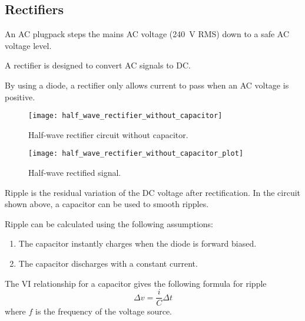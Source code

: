 \documentclass{article}
\begin{document}
\subsection{Rectifiers}
\begin{definition}[Plugpack]
    An AC plugpack steps the mains AC voltage (\SI{240}{\volt} RMS) down to a safe AC voltage level.
\end{definition}
\begin{definition}[Rectifier]
    A rectifier is designed to convert AC signals to DC\@.
\end{definition}
By using a diode, a rectifier only allows current to pass when an AC
voltage is positive.
\begin{figure}[H]
    \centering
    \texttt{[image: half\_wave\_rectifier\_without\_capacitor]}
    \caption{Half-wave rectifier circuit without capacitor.}
\end{figure}
\begin{figure}[H]
    \centering
    \texttt{[image: half\_wave\_rectifier\_without\_capacitor\_plot]}
    \caption{Half-wave rectified signal.}
\end{figure}
\begin{definition}[Ripple]
    Ripple is the residual variation of the DC voltage after rectification.
    In the circuit shown above, a capacitor can be used to smooth ripples.

    Ripple can be calculated using the following assumptions:
    \begin{enumerate}
        \item The capacitor instantly charges when the diode is forward biased.
        \item The capacitor discharges with a constant current.
    \end{enumerate}
    The VI relationship for a capacitor gives the following formula for ripple
    \begin{equation*}
        \Delta v = \frac{i}{C} \Delta t
    \end{equation*}
    where $f$ is the frequency of the voltage source.
\end{definition}
\end{document}
